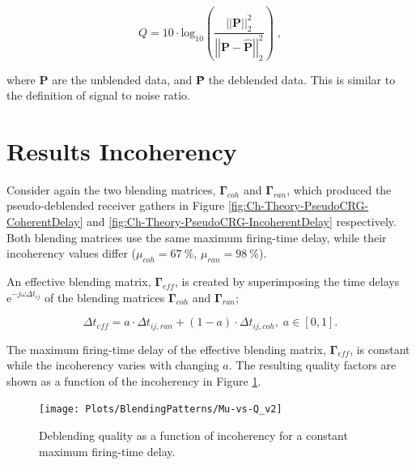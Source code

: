 \begin{equation}
	Q = 10 \cdot \mathrm{log_{10}} \left( \frac{\left|\left|\mathbf{P}\right|\right| _2 ^2}{\left|\left|\mathbf{P - \hat{P}}\right|\right| _2 ^2} \right) \;,	
\end{equation}

where $\mathbf{P}$ are the unblended data, and \textbf{\^{P}} the deblended data. This is similar to the definition of signal to noise ratio. 





\section{Results Incoherency}

Consider again the two blending matrices, $\mathbf{\Gamma}_{coh}$ and $\mathbf{\Gamma}_{ran}$, which produced the pseudo-deblended receiver gathers in Figure \ref{fig:Ch-Theory-PseudoCRG-CoherentDelay} and \ref{fig:Ch-Theory-PseudoCRG-IncoherentDelay} respectively. Both blending matrices use the same maximum firing-time delay, while their incoherency values differ ($\mu_{coh} = \SI{67}{\percent}$, $\mu_{ran} = \SI{98}{\percent}$). 

An effective blending matrix, $\mathbf{\Gamma}_{eff}$, is created by superimposing the time delays $\mathrm{e}^{-j \omega \Delta t_{ij}}$ of the blending matrices $\mathbf{\Gamma}_{coh}$ and $\mathbf{\Gamma}_{ran}$;

\begin{equation}
	\Delta t_{eff} = a \cdot \Delta t_{ij,ran} + (1 - a) \cdot \Delta t_{ij,coh}, \; a \in [0,1].
	\label{eq:Ch-Incoherency-EffectiveG}
\end{equation}


The maximum firing-time delay of the effective blending matrix, $\mathbf{\Gamma}_{eff}$, is constant while the incoherency  varies with changing $a$. The resulting quality factors are shown as a function of the incoherency in Figure \ref{fig:Ch-Results-Quality-vs-Incoherency}.


\begin{figure}
	\centering
	\texttt{[image: Plots/BlendingPatterns/Mu-vs-Q\_v2]}
	\caption{Deblending quality as a function of incoherency for a constant maximum firing-time delay.}
	\label{fig:Ch-Results-Quality-vs-Incoherency}
\end{figure}

